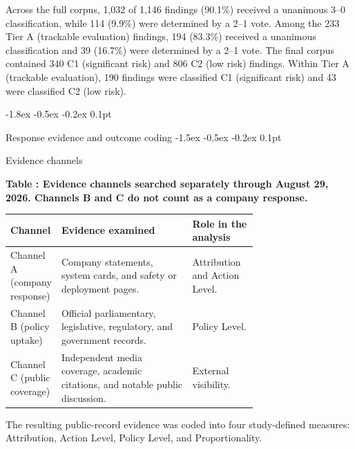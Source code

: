 \documentclass{article}
\makeatletter
\renewcommand{\subsection}{%
  \@startsection{subsection}{2}{\z@}%
                {-1.8ex \@plus -0.5ex \@minus -0.2ex}%
                {0.1pt}%
                {\normalsize\bf\raggedright}%
}
\renewcommand{\subsubsection}{%
  \@startsection{subsubsection}{3}{\z@}%
                {-1.5ex \@plus -0.5ex \@minus -0.2ex}%
                {0.1pt}%
                {\normalsize\bf\raggedright}%
}
\makeatother
\begin{document}
Across the full corpus, 1,032 of 1,146 findings (90.1\%) received a unanimous 3--0 classification, while 114 (9.9\%) were determined by a 2--1 vote. Among the 233 Tier A (trackable evaluation) findings, 194 (83.3\%) received a unanimous classification and 39 (16.7\%) were determined by a 2--1 vote. The final corpus contained 340 C1 (significant risk) and 806 C2 (low risk) findings. Within Tier A (trackable evaluation), 190 findings were classified C1 (significant risk) and 43 were classified C2 (low risk).

\subsection{Response evidence and outcome coding}\label{sec:coding}
\subsubsection{Evidence channels}\label{sec:evidence-channels}
\noindent\begin{minipage}{\textwidth}
\centering
{}
\label{tab:evidence-channels}
\textbf{Table \thetable: Evidence channels searched separately through August 29, 2026. Channels B and C do not count as a company response.}\par\smallskip
\scriptsize
\setlength{\tabcolsep}{3pt}
\renewcommand{\arraystretch}{1.0}
\begin{tabularx}{\textwidth}{>{\raggedright\arraybackslash}p{0.18\linewidth} >{\raggedright\arraybackslash}p{0.53\linewidth} >{\raggedright\arraybackslash}X}
\toprule
Channel & Evidence examined & Role in the analysis \\
\midrule
Channel A (company response) & Company statements, system cards, and safety or deployment pages. & Attribution and Action Level. \\
Channel B (policy uptake) & Official parliamentary, legislative, regulatory, and government records. & Policy Level. \\
Channel C (public coverage) & Independent media coverage, academic citations, and notable public discussion. & External visibility. \\
\bottomrule
\end{tabularx}
\end{minipage}
\par\smallskip

The resulting public-record evidence was coded into four study-defined measures: Attribution, Action Level, Policy Level, and Proportionality.
\end{document}
